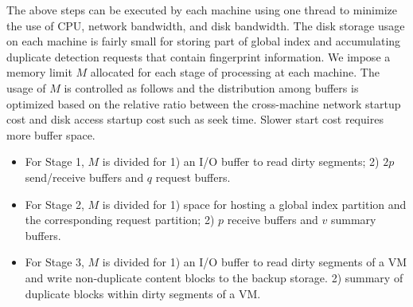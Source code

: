 The above steps can be executed by each machine
using one thread to minimize the use of CPU, network bandwidth, and disk bandwidth.
The  disk storage usage on each machine 
is fairly small for  storing part of global index and
accumulating  duplicate detection requests that contain fingerprint information.   
We impose a memory limit $M$ allocated for each stage of processing at each machine.
The usage of $M$ is controlled as follows and the distribution among buffers is optimized based on the relative
ratio between the cross-machine network  startup cost and disk access startup cost such as seek time.
Slower start cost requires more buffer space.
\begin{itemize}
\item For Stage 1, $M$  is divided for 
1) an I/O buffer to read dirty segments; 2) $2p$ send/receive buffers and $q$ request  buffers.

\item 
For Stage 2,  $M$  is divided for 1) space for hosting a global index partition and 
the corresponding request partition; 2) $p$ receive buffers and $v$ summary buffers.

\item For Stage 3, $M$  is divided for 1) an I/O buffer to read dirty segments of a VM and   
write non-duplicate content blocks to the  backup storage.
2) summary of duplicate blocks within dirty segments of  a VM.
\end{itemize}

